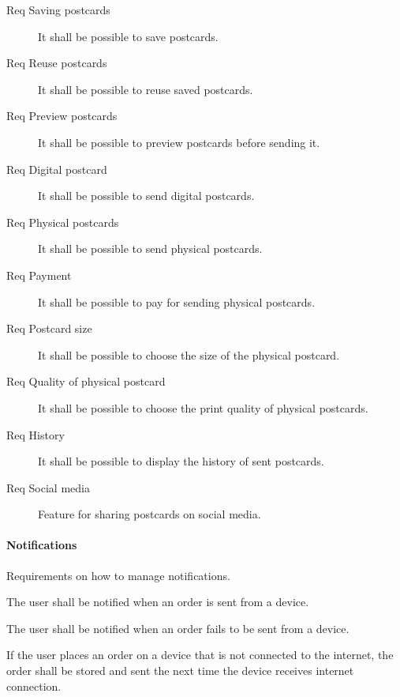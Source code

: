 \documentclass[10pt,a4paper]{article}
\begin{document}
\begin{description}
	\item [Req  Saving postcards] It shall be possible to save postcards.
	\item [Req  Reuse postcards] It shall be possible to reuse saved postcards.
	
	\item [Req  Preview postcards] It shall be possible to preview postcards before sending it.
	
	\item [Req  Digital postcard] It shall be possible to send digital postcards.
	\item [Req  Physical postcards] It shall be possible to send physical postcards.
	
	\item [Req  Payment] It shall be possible to pay for sending physical postcards.
	
	\item [Req  Postcard size] It shall be possible to choose the size of the physical postcard.
	\item [Req  Quality of physical postcard] It shall be possible to choose the print quality of physical postcards. 
	\item [Req  History] It shall be possible to display the history of sent postcards.
	
	\item [Req  Social media] Feature for sharing postcards on social media.
\end{description}

\paragraph{Notifications}
Requirements on how to manage notifications.

\begin{description}
	\item [Req \thesubsubsection {.\theproduct} Success notification] The user shall be notified when an order is sent from a device.
	\item [Req \thesubsubsection {.\theproduct} Fail notification] The user shall be notified when an order fails to be sent from a device.

	\item [Req \thesubsubsection {.\theproduct} No internet] If the user places an order on a device that is not connected to the internet, the order shall be stored and sent the next time the device receives internet connection. 
\end{description}
\end{document}

